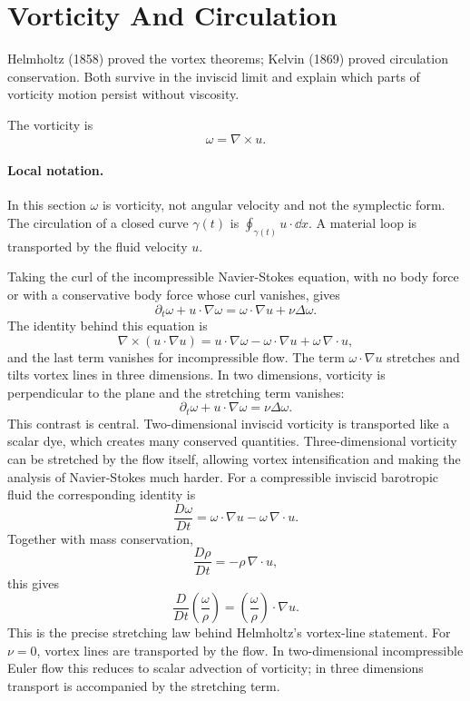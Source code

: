 \section{Vorticity And Circulation}
\label{sec:vorticity-circulation}

Helmholtz (1858) proved the vortex theorems; Kelvin (1869) proved circulation
conservation. Both survive in the inviscid limit and explain which parts of
vorticity motion persist without viscosity.

The vorticity is
\[
  \omega=\nabla\times u.
\]

\paragraph{Local notation.}
In this section \(\omega\) is vorticity, not angular velocity and not the
symplectic form.  The circulation of a closed curve \(\gamma(t)\) is
\(\oint_{\gamma(t)}u\cdot\dd x\).  A material loop is transported by the fluid
velocity \(u\).

Taking the curl of the incompressible Navier-Stokes equation, with no body
force or with a conservative body force whose curl vanishes, gives
\[
  \boxed{
  \partial_t\omega+u\cdot\nabla\omega
  =
  \omega\cdot\nabla u+\nu\Delta\omega.
  }
\]
The identity behind this equation is
\[
  \nabla\times(u\cdot\nabla u)
  =
  u\cdot\nabla\omega-\omega\cdot\nabla u
  +
  \omega\,\nabla\cdot u,
\]
and the last term vanishes for incompressible flow.
The term \(\omega\cdot\nabla u\) stretches and tilts vortex lines in three
dimensions. In two dimensions, vorticity is perpendicular to the plane and the
stretching term vanishes:
\[
  \partial_t\omega+u\cdot\nabla\omega=\nu\Delta\omega.
\]
This contrast is central. Two-dimensional inviscid vorticity is transported
like a scalar dye, which creates many conserved quantities. Three-dimensional
vorticity can be stretched by the flow itself, allowing vortex intensification
and making the analysis of Navier-Stokes much harder.
For a compressible inviscid barotropic fluid the corresponding identity is
\[
  \frac{D\omega}{Dt}
  =
  \omega\cdot\nabla u-\omega\,\nabla\cdot u.
\]
Together with mass conservation,
\[
  \frac{D\rho}{Dt}=-\rho\,\nabla\cdot u,
\]
this gives
\[
  \boxed{
  \frac{D}{Dt}\left(\frac{\omega}{\rho}\right)
  =
  \left(\frac{\omega}{\rho}\right)\cdot\nabla u.
  }
\]
This is the precise stretching law behind Helmholtz's vortex-line statement.
For \(\nu=0\), vortex lines are transported by the flow. In two-dimensional
incompressible Euler flow this reduces to scalar advection of vorticity; in
three dimensions transport is accompanied by the stretching term.

